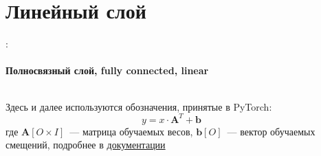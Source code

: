 \documentclass{beamer}
\newcommand{\mtx}[1]{\boldsymbol{#1}}
\begin{document}
\section{Линейный слой}

\begin{frame}{\secname : \subsecname}
  \framesubtitle{Полносвязный слой, fully connected, linear}
  \begin{columns}

    \begin{column}{0.5\textwidth}
      Здесь и далее используются обозначения, принятые в PyTorch:
      $$
      y = x \cdot \mtx{A}^T + \mtx{b}
      $$
      где $\mtx{A}[O \times I]$~--- матрица обучаемых весов,
      $\mtx{b}[O]$~--- вектор обучаемых смещений,
      подробнее в
      \href{https://docs.pytorch.org/docs/stable/generated/torch.nn.Linear.html}{документации}

    \end{column}

    \begin{column}{0.5\textwidth}
      \begin{center}
      \end{center}
    \end{column}

  \end{columns}
\end{frame}
\end{document}
